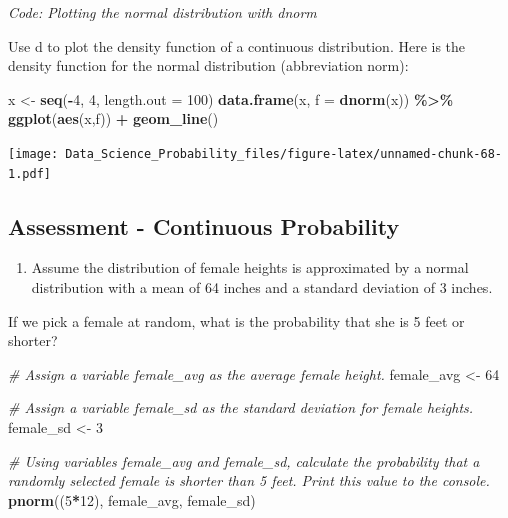 \documentclass[
]{article}
\newenvironment{Shaded}{\begin{snugshade}}{\end{snugshade}}
\newcommand{\CommentTok}[1]{\textcolor[rgb]{0.56,0.35,0.01}{\textit{#1}}}
\newcommand{\DataTypeTok}[1]{\textcolor[rgb]{0.13,0.29,0.53}{#1}}
\newcommand{\DecValTok}[1]{\textcolor[rgb]{0.00,0.00,0.81}{#1}}
\newcommand{\KeywordTok}[1]{\textcolor[rgb]{0.13,0.29,0.53}{\textbf{#1}}}
\newcommand{\NormalTok}[1]{#1}
\newcommand{\OperatorTok}[1]{\textcolor[rgb]{0.81,0.36,0.00}{\textbf{#1}}}
\newcommand{\StringTok}[1]{\textcolor[rgb]{0.31,0.60,0.02}{#1}}
\providecommand{\tightlist}{%
  \setlength{\itemsep}{0pt}\setlength{\parskip}{0pt}}
\begin{document}
\emph{Code: Plotting the normal distribution with dnorm}

Use d to plot the density function of a continuous distribution. Here is
the density function for the normal distribution (abbreviation norm):

\begin{Shaded}
\begin{Highlighting}[]
\NormalTok{x \textless{}{-}}\StringTok{ }\KeywordTok{seq}\NormalTok{(}\OperatorTok{{-}}\DecValTok{4}\NormalTok{, }\DecValTok{4}\NormalTok{, }\DataTypeTok{length.out =} \DecValTok{100}\NormalTok{)}
\KeywordTok{data.frame}\NormalTok{(x, }\DataTypeTok{f =} \KeywordTok{dnorm}\NormalTok{(x)) }\OperatorTok{\%\textgreater{}\%}
\StringTok{    }\KeywordTok{ggplot}\NormalTok{(}\KeywordTok{aes}\NormalTok{(x,f)) }\OperatorTok{+}
\StringTok{    }\KeywordTok{geom\_line}\NormalTok{()}
\end{Highlighting}
\end{Shaded}

\texttt{[image: Data\_Science\_Probability\_files/figure-latex/unnamed-chunk-68-1.pdf]}

\hypertarget{assessment---continuous-probability}{%
\subsection{Assessment - Continuous
Probability}\label{assessment---continuous-probability}}

\begin{enumerate}
\def\labelenumi{\arabic{enumi}.}
\tightlist
\item
  Assume the distribution of female heights is approximated by a normal
  distribution with a mean of 64 inches and a standard deviation of 3
  inches.
\end{enumerate}

If we pick a female at random, what is the probability that she is 5
feet or shorter?

\begin{Shaded}
\begin{Highlighting}[]
\CommentTok{\# Assign a variable \textquotesingle{}female\_avg\textquotesingle{} as the average female height.}
\NormalTok{female\_avg \textless{}{-}}\StringTok{ }\DecValTok{64}

\CommentTok{\# Assign a variable \textquotesingle{}female\_sd\textquotesingle{} as the standard deviation for female heights.}
\NormalTok{female\_sd \textless{}{-}}\StringTok{ }\DecValTok{3}

\CommentTok{\# Using variables \textquotesingle{}female\_avg\textquotesingle{} and \textquotesingle{}female\_sd\textquotesingle{}, calculate the probability that a randomly selected female is shorter than 5 feet. Print this value to the console.}
\KeywordTok{pnorm}\NormalTok{((}\DecValTok{5}\OperatorTok{*}\DecValTok{12}\NormalTok{), female\_avg, female\_sd)}
\end{Highlighting}
\end{Shaded}
\end{document}
